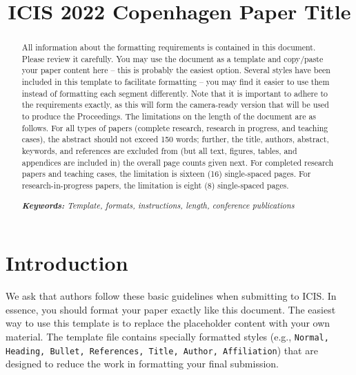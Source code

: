\documentclass{icis}
\title{ICIS 2022 Copenhagen Paper Title}
\begin{document}
\maketitle



\begin{abstract}
  All information about the formatting requirements is contained in this document. Please
  review it carefully. You may use the document as a template and copy/paste your paper
  content here – this is probably the easiest option. Several styles have been included in
  this template to facilitate formatting – you may find it easier to use them instead of
  formatting each segment differently.  Note that it is important to adhere to the
  requirements exactly, as this will form the camera-ready version that will be used to
  produce the Proceedings. The limitations on the length of the document are as
  follows. For all types of papers (complete research, research in progress, and teaching
  cases), the abstract should not exceed 150 words; further, the title, authors, abstract,
  keywords, and references are excluded from (but all text, figures, tables, and
  appendices are included in) the overall page counts given next. For completed research
  papers and teaching cases, the limitation is sixteen (16) single-spaced pages. For
  research-in-progress papers, the limitation is eight (8) single-spaced pages.

  \emph{\textbf{Keywords:} Template, formats, instructions, length, conference publications}
\end{abstract}


\section{Introduction}

We ask that authors follow these basic guidelines when submitting to ICIS. In
essence, you should format your paper exactly like this document. The easiest
way to use this template is to replace the placeholder content with your own
material. The template file contains specially formatted styles (e.g.,
\texttt{Normal, Heading, Bullet, References, Title, Author, Affiliation}) that
are designed to reduce the work in formatting your final submission.
\end{document}
